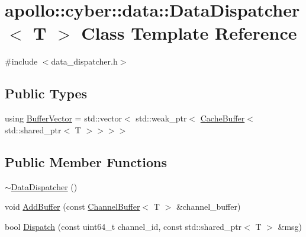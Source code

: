 \hypertarget{classapollo_1_1cyber_1_1data_1_1DataDispatcher}{\section{apollo\-:\-:cyber\-:\-:data\-:\-:Data\-Dispatcher$<$ T $>$ Class Template Reference}
\label{classapollo_1_1cyber_1_1data_1_1DataDispatcher}
}


{\ttfamily \#include $<$data\-\_\-dispatcher.\-h$>$}

\subsection*{Public Types}
\begin{DoxyCompactItemize}
\item 
using \hyperlink{classapollo_1_1cyber_1_1data_1_1DataDispatcher_a705b3d7e33c176168be27202c1e9269f}{Buffer\-Vector} = std\-::vector$<$ std\-::weak\-\_\-ptr$<$ \hyperlink{classapollo_1_1cyber_1_1data_1_1CacheBuffer}{Cache\-Buffer}$<$ std\-::shared\-\_\-ptr$<$ T $>$$>$$>$$>$
\end{DoxyCompactItemize}
\subsection*{Public Member Functions}
\begin{DoxyCompactItemize}
\item 
\hyperlink{classapollo_1_1cyber_1_1data_1_1DataDispatcher_a00fbebfb574538bd47f427f48aa2cb8d}{$\sim$\-Data\-Dispatcher} ()
\item 
void \hyperlink{classapollo_1_1cyber_1_1data_1_1DataDispatcher_a5c25d4ea21bfc0f7333c07a7da9b27d2}{Add\-Buffer} (const \hyperlink{classapollo_1_1cyber_1_1data_1_1ChannelBuffer}{Channel\-Buffer}$<$ T $>$ \&channel\-\_\-buffer)
\item 
bool \hyperlink{classapollo_1_1cyber_1_1data_1_1DataDispatcher_a96935453604a6f47112f417897c07aeb}{Dispatch} (const uint64\-\_\-t channel\-\_\-id, const std\-::shared\-\_\-ptr$<$ T $>$ \&msg)
\end{DoxyCompactItemize}
